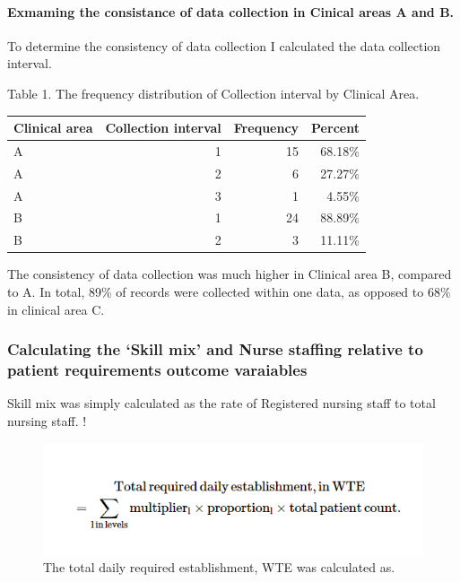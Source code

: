 \documentclass[
]{article}
\begin{document}
\hypertarget{exmaming-the-consistance-of-data-collection-in-cinical-areas-a-and-b.}{%
\paragraph{Exmaming the consistance of data collection in Cinical areas
A and
B.}\label{exmaming-the-consistance-of-data-collection-in-cinical-areas-a-and-b.}}

To determine the consistency of data collection I calculated the data
collection interval.

Table 1. The frequency distribution of Collection interval by Clinical
Area.

\begin{longtable}[]{@{}lrrr@{}}
\toprule\noalign{}
Clinical area & Collection interval & Frequency & Percent \\
\midrule\noalign{}
\endhead
\bottomrule\noalign{}
\endlastfoot
A & 1 & 15 & 68.18\% \\
A & 2 & 6 & 27.27\% \\
A & 3 & 1 & 4.55\% \\
B & 1 & 24 & 88.89\% \\
B & 2 & 3 & 11.11\% \\
\end{longtable}

The consistency of data collection was much higher in Clinical area B,
compared to A. In total, 89\% of records were collected within one data,
as opposed to 68\% in clinical area C.

\hypertarget{calculating-the-skill-mix-and-nurse-staffing-relative-to-patient-requirements-outcome-varaiables}{%
\subsubsection{Calculating the `Skill mix' and Nurse staffing relative
to patient requirements outcome
varaiables}\label{calculating-the-skill-mix-and-nurse-staffing-relative-to-patient-requirements-outcome-varaiables}}

Skill mix was simply calculated as the rate of Registered nursing staff
to total nursing staff. !

\begin{figure}
\centering
\includegraphics{./../../Output/Visuals/rWTE.png}
\caption{The total daily required establishment, WTE was calculated as.}
\end{figure}
\end{document}
